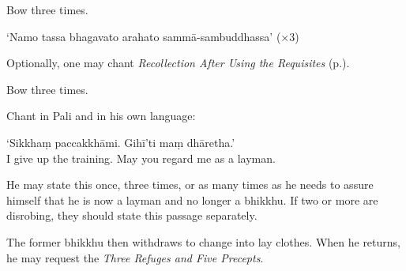 Bow three times.

‘Namo tassa bhagavato arahato sammā-sambuddhassa’ (×3)

Optionally, one may chant \emph{Recollection After Using the Requisites}
(p.\pageref{recollection-after-using}).

Bow three times.

Chant in Pali and in his own language:

‘Sikkhaṃ paccakkhāmi. Gihī'ti maṃ dhāretha.’\\
I give up the training. May you regard me as a layman.

He may state this once, three times, or as many times as he needs to assure
himself that he is now a layman and no longer a bhikkhu. If two or more are
disrobing, they should state this passage separately.

The former bhikkhu then withdraws to change into lay clothes. When he returns,
he may request the \emph{Three Refuges and Five Precepts}.

